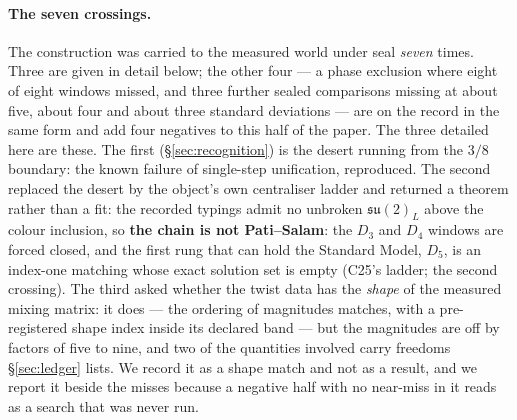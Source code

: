 \documentclass[11pt,a4paper]{article}
\theoremstyle{definition}
\theoremstyle{remark}
\begin{document}
\paragraph{The seven crossings.} The construction was carried to the measured world under seal \emph{seven}
times. Three are given in detail below; the other four --- a phase exclusion where eight of eight windows missed, and
three further sealed comparisons missing at about five, about four and about three standard deviations --- are on the
record in the same form and add four negatives to this half of the paper. The three detailed here are these. The first (\S\ref{sec:recognition}) is the desert running from the $3/8$ boundary: the known
failure of single-step unification, reproduced. The second replaced the desert by the object's own centraliser ladder and
returned a theorem rather than a fit: the recorded typings admit no unbroken $\mathfrak{su}(2)_L$ above the colour inclusion,
so \textbf{the chain is not Pati--Salam}: the $D_3$ and $D_4$ windows are forced closed, and the first rung that can hold the
Standard Model, $D_5$, is an index-one matching whose exact solution set is empty (C25's ladder; the second crossing). The
third asked whether the twist data has the \emph{shape} of the measured mixing matrix: it does --- the ordering of magnitudes
matches, with a pre-registered shape index inside its declared band --- but the magnitudes are off by factors of five to nine,
and two of the quantities involved carry freedoms \S\ref{sec:ledger} lists. We record it as a shape match and not as a result,
and we report it beside the misses because a negative half with no near-miss in it reads as a search that was never run.
\end{document}
